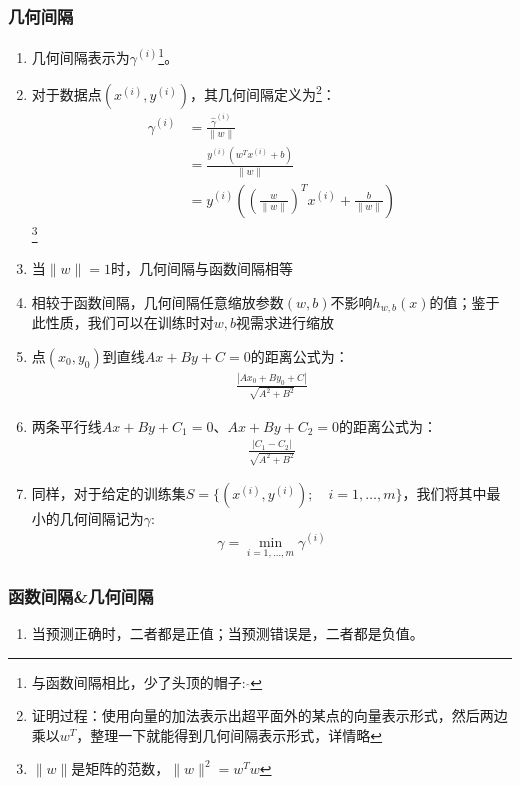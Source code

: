 \subsubsection{几何间隔}
\begin{enumerate}
	\item 几何间隔表示为$\gamma^{(i)}$\footnote{与函数间隔相比，少了头顶的帽子: $\hat{ }$}。
	\item 对于数据点$(x^{(i)}, y^{(i)})$，其几何间隔定义为\footnote{证明过程：使用向量的加法表示出超平面外的某点的向量表示形式，然后两边乘以$w^T$，整理一下就能得到几何间隔表示形式，详情略}：
	\begin{align}
		\gamma^{(i)} &= \frac{\hat{\gamma}^{(i)}}{\|w\|}  \\
		&= \frac{y^{(i)}(w^Tx^{(i)} + b)}{\|w\|}  \\
		&=  y^{(i)} \left(\left(\frac{w}{\|w\|}\right)^T x^{(i)} + \frac{b}{\|w\|}\right)
	\end{align}
	\footnote{$\|w\|$是矩阵的范数，$\|w\|^2=w^Tw$}
	\item 当$\|w\|=1$时，几何间隔与函数间隔相等
	\item 相较于函数间隔，几何间隔任意缩放参数$(w,b)$不影响$h_{w,b}(x)$的值；鉴于此性质，我们可以在训练时对$w, b$视需求进行缩放
	\item 点$(x_0, y_0)$到直线$Ax+By+C=0$的距离公式为：
	\begin{align}
		\frac{|Ax_0 + By_0 + C|}{\sqrt{A^2+B^2}}
	\end{align}
	\item 两条平行线$Ax+By+C_1=0$、$Ax+By+C_2=0$的距离公式为：
	\begin{align}
		\frac{|C_1 - C_2|}{\sqrt{A^2+B^2}}
	\end{align}
	\item 同样，对于给定的训练集$S=\{(x^{(i)}, y^{(i)}); \quad i = 1, \dots, m\}$，我们将其中最小的几何间隔记为$\gamma$:
	\begin{align}
		\gamma = \min_{i=1,\dots,m}\gamma^{(i)}
	\end{align}
\end{enumerate}

\subsubsection{函数间隔\&几何间隔}
\begin{enumerate}
	\item 当预测正确时，二者都是正值；当预测错误是，二者都是负值。
\end{enumerate}

